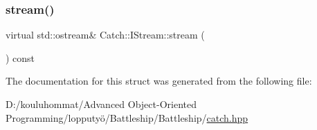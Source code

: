\subsubsection{\texorpdfstring{stream()}{stream()}}
{\footnotesize\ttfamily virtual std\+::ostream\& Catch\+::\+I\+Stream\+::stream (\begin{DoxyParamCaption}{ }\end{DoxyParamCaption}) const\hspace{0.3cm}{\ttfamily [pure virtual]}}



The documentation for this struct was generated from the following file\+:\begin{DoxyCompactItemize}
\item 
D\+:/kouluhommat/\+Advanced Object-\/\+Oriented Programming/lopputyö/\+Battleship/\+Battleship/\mbox{\hyperlink{catch_8hpp}{catch.\+hpp}}\end{DoxyCompactItemize}
